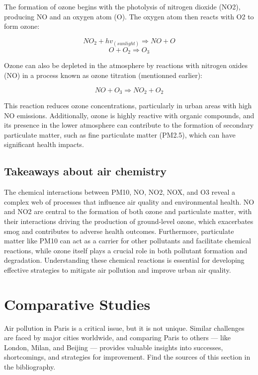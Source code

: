 \documentclass{modeleRapport}
\begin{document}
The formation of ozone begins with the photolysis of nitrogen dioxide (NO2), producing NO and an oxygen atom (O). The 
oxygen atom then reacts with O2 to form ozone:

$$NO_2 + hv_{(sunlight)} \Rightarrow NO+O$$
$$O+O_2 \Rightarrow O_3$$

Ozone can also be depleted in the atmosphere by reactions with nitrogen oxides (NO) in a process known as ozone titration
(mentionned earlier):

$$NO + O_3 \Rightarrow NO_2 + O_2$$

This reaction reduces ozone concentrations, particularly in urban areas with high NO emissions. Additionally, ozone is 
highly reactive with organic compounds, and its presence in the lower atmosphere can contribute to the formation of 
secondary particulate matter, such as fine particulate matter (PM2.5), which can have significant health impacts.

\subsection{Takeaways about air chemistry}

The chemical interactions between PM10, NO, NO2, NOX, and O3 reveal a complex web of processes that influence air 
quality and environmental health. NO and NO2 are central to the formation of both ozone and particulate matter, with their 
interactions driving the production of ground-level ozone, which exacerbates smog and contributes to adverse health outcomes. 
Furthermore, particulate matter like PM10 can act as a carrier for other pollutants and facilitate chemical reactions, while 
ozone itself plays a crucial role in both pollutant formation and degradation. Understanding these chemical reactions is 
essential for developing effective strategies to mitigate air pollution and improve urban air quality.

\newpage
\section{Comparative Studies}

Air pollution in Paris is a critical issue, but it is not unique. Similar challenges are faced by major cities worldwide, 
and comparing Paris to others — like London, Milan, and Beijing — provides valuable insights into successes, shortcomings, 
and strategies for improvement. Find the sources of this section in the bibliography.\cite{KingsCollege}\cite{MDPI}\cite{ERS}\cite{EuropeanScientists}\\
\end{document}

